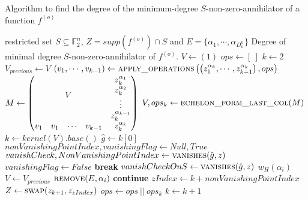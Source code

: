 \documentclass[11pt]{llncs}
\begin{document}
\begin{algorithm}
	\caption{Algorithm to find the degree of the minimum-degree $S$-non-zero-annihilator of a function $f^{(o)}$}\label{alg:MinDegreeSnonZeroAnnihilatorIterative}
	\begin{algorithmic}[1]
		\Require restricted set $S\subseteq \mathbb{F}_2^n$, $Z = supp\left(f^{(o)}\right) \cap S$ and $E = \{\alpha_1, \cdots, \alpha_{D_n^n}\}$
		\Ensure Degree of minimal degree $S$-non-zero-annihilator of $f^{(o)}$.
		\State
		\State $V\gets (1)$
		\State $ops \gets [\ ]$
		\State $k \gets 2$
		\State $V_{previous} \gets V$
		\State $\left(v_1, \cdots, v_{k-1}\right) \gets \mbox{\textsc{apply\_operations}}\left(\left(z_1^{\alpha_k}, \cdots, z_{k-1}^{\alpha_k}\right), ops\right)$
		\State  $M \gets \begin{pmatrix}
		\multicolumn{4}{c}{\multirow{4}{*}{$V$}} & z_k^{\alpha_1}\\
		& & & & z_k^{\alpha_2}\\
		& & & & \vdots\\
		& & & & z_k^{\alpha_{k-1}}\\
		v_1 & v_1& \cdots & v_{k-1} & z_k^{\alpha_k}
		\end{pmatrix}$
		\State $V, ops_k\gets \mbox{\textsc{echelon\_form\_last\_col}}(M)$
		\State $k \gets kernel\left(V\right).base()$
		\State $\hat{g} \gets k[0]$
		\State $nonVanishingPointIndex, vanishingFlag \gets Null, True$
		\State $vanishCheck, NonVanishingPointIndex \gets \mbox{\textsc{vanishes}}(\hat{g}, z)$
		\State $vanishingFlag \gets False$
		\State \textbf{break}
		\EndIf
		\State $vanishCheckOnS \gets \mbox{\textsc{vanishes}}(\hat{g}, z)$
		\State \Return $w_H\left(\alpha_i\right)$
		\EndIf
		\EndFor
		\State $V\gets V_{previous}$
		\State $\mbox{\textsc{remove}}(E, \alpha_i)$
		\State \textbf{continue}
		\EndFor
		\State $zIndex \gets k+nonVanishingPointIndex$
		\State $Z \gets \mbox{\textsc{swap}}(z_{k+1}, z_{zIndex})$
		\State $ops\gets ops\ ||\ ops_k$
		\State $k\gets k+1$
		\EndIf
		\EndWhile
		\State {}
	\end{algorithmic}
\end{algorithm}
\newpage
\end{document}
